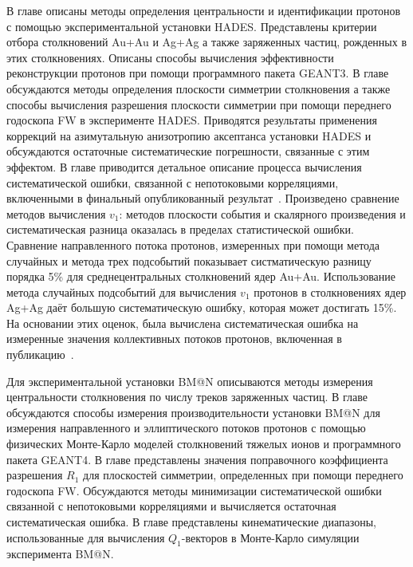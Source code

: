 В главе описаны методы определения центральности и идентификации протонов с помощью экспериментальной установки HADES.
Представлены критерии отбора столкновений Au+Au и Ag+Ag а также заряженных частиц, рожденных в этих столкновениях.
Описаны способы вычисления эффективности реконструкции протонов при помощи программного пакета GEANT3.
В главе обсуждаются методы определения плоскости симметрии столкновения а также способы вычисления разрешения плоскости симметрии при помощи переднего годоскопа FW в эксперименте HADES.
Приводятся результаты применения коррекций на азимутальную анизотропию аксептанса установки HADES и обсуждаются остаточные систематические погрешности, связанные с этим эффектом.
В главе приводится детальное описание процесса вычисления систематической ошибки, связанной с непотоковыми корреляциями, включенными в финальный опубликованный результат~\cite{HADES:2020lob}.
Произведено сравнение методов вычисления $v_1$: методов плоскости события и скалярного произведения и систематическая разница оказалась в пределах статистической ошибки.
Сравнение направленного потока протонов, измеренных при помощи метода случайных и метода трех подсобытий показывает систматическую разницу порядка 5\% для среднецентральных столкновений ядер Au+Au.
Использование метода случайных подсобытий для вычисления $v_1$ протонов в столкновениях ядер Ag+Ag даёт большую систематическую ошибку, которая может достигать 15\%.
На основании этих оценок, была вычислена систематическая ошибка на измеренные значения коллективных потоков протонов, включенная в публикацию~\cite{HADES:2020lob}.

Для экспериментальной установки BM@N описываются методы измерения центральности столкновения по числу треков заряженных частиц. 
В главе обсуждаются способы измерения производительности установки BM@N для измерения направленного и эллиптического потоков протонов с помощью физических Монте-Карло моделей столкновений тяжелых ионов и программного пакета GEANT4.
В главе представлены значения поправочного коэффициента разрешения $R_1$ для плоскостей симметрии, определенных при помощи переднего годоскопа FW.
Обсуждаются методы минимизации систематической ошибки связанной с непотоковыми корреляциями и вычисляется остаточная систематическая ошибка.
В главе представлены кинематические диапазоны, использованные для вычисления $Q_1$-векторов в Монте-Карло симуляции эксперимента BM@N.